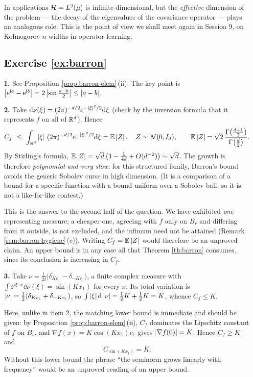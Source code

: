 \documentclass[11pt,a4paper]{article}
\begin{document}
In applications $\mathcal{H} = L^2(\mu)$ is infinite-dimensional, but the \emph{effective} dimension of the
problem --- the decay of the eigenvalues of the covariance operator --- plays an analogous role.
This is the point of view we shall meet again in Session 9, on Kolmogorov $n$-widths in operator
learning.

\subsection*{Exercise \ref{ex:barron}}

\textbf{1.} See Proposition \ref{prop:barron-elem}\,(ii). The key point is
$\left\lvert \mathrm{e}^{\mathrm{i} a} - \mathrm{e}^{\mathrm{i} b} \right\rvert = 2\left\lvert \sin\frac{a-b}{2} \right\rvert \le \left\lvert a - b \right\rvert$.

\textbf{2.} Take $\mathrm{d}\nu(\xi) = (2\pi)^{-d/2}\mathrm{e}^{-\left\lvert \xi \right\rvert^2/2}\mathrm{d}\xi$ (check by the inversion
formula that it represents $f$ on all of $\mathbb{R}^d$). Hence
\[
C_f \ \le\ \int_{\R^d}\abs\xi\,(2\pi)^{-d/2}\ee^{-\abs\xi^2/2}\dd\xi = \E\abs{Z},\quad Z\sim\Nn(0,I_d),
\qquad
\E\abs Z = \sqrt2\,\frac{\Gamma\big(\frac{d+1}2\big)}{\Gamma\big(\frac d2\big)} .
\]
By Stirling's formula, $\mathbb{E}\left\lvert Z \right\rvert = \sqrt d\,\big(1 - \tfrac{1}{4d} + O(d^{-2})\big) \sim \sqrt d$.
The growth is therefore \emph{polynomial and very slow}: for this structured family, Barron's bound
avoids the generic Sobolev curse in high dimension. (It is a comparison of a bound for a specific
function with a bound uniform over a Sobolev ball, so it is not a like-for-like contest.)

This is the answer to the second half of the question. We have exhibited \emph{one} representing
measure; a cheaper one, agreeing with $f$ only on $B_r$ and differing from it outside, is not
excluded, and the infimum need not be attained
(Remark \ref{rem:barron-hygiene}\,(c)). Writing $C_f = \mathbb{E}\left\lvert Z \right\rvert$ would therefore be an unproved
claim. An upper bound is in any case all that Theorem \ref{th:barron} consumes, since its conclusion
is increasing in $C_f$.

\textbf{3.} Take $\nu = \frac{1}{2\ii}\big(\delta_{Ke_1} - \delta_{-Ke_1}\big)$, a finite complex
measure with $\int \ee^{\ii \xi\cdot x}\dd\nu(\xi) = \sin(Kx_1)$ for every $x$. Its total variation
is $\left\lvert \nu \right\rvert = \tfrac12(\delta_{Ke_1} + \delta_{-Ke_1})$, so
$\int\left\lvert \xi \right\rvert\mathrm{d}\left\lvert \nu \right\rvert = \tfrac12 K + \tfrac12 K = K$, whence $C_f \le K$.

Here, unlike in item 2, the matching lower bound is immediate and should be given: by
Proposition \ref{prop:barron-elem}\,(ii), $C_f$ dominates the Lipschitz constant of $f$ on $B_r$,
and $\nabla f(x) = K\cos(Kx_1)e_1$ gives $\left\lvert \nabla f(0) \right\rvert = K$. Hence $C_f \ge K$ and
\[
C_{\sin(K x_1)} = K .
\]
Without this lower bound the phrase ``the seminorm grows linearly with frequency'' would be an
unproved reading of an upper bound.
\end{document}
